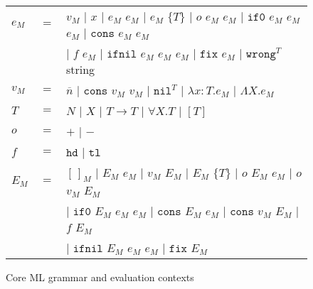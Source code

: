 \begin{figure}[p]
\centering
\begin{tabular}{lcl}
$e_{M}$ & $=$ & $v_{M}$ $\vert$ $x$ $\vert$ $e_{M}$ $e_{M}$ $\vert$ $e_{M}$ $\lbrace T\rbrace$ $\vert$ $o$ $e_{M}$ $e_{M}$ $\vert$ $\mathtt{if0}$ $e_{M}$ $e_{M}$ $e_{M}$ $\vert$ $\mathtt{cons}$ $e_{M}$ $e_{M}$ \\

\vspace{5pt}

&& $\vert$ $f$ $e_{M}$ $\vert$ $\mathtt{ifnil}$ $e_{M}$ $e_{M}$ $e_{M}$ $\vert$ $\mathtt{fix}$ $e_{M}$ $\vert$ $\mathtt{wrong}^{T}$ string \\

\vspace{5pt}

$v_{M}$ & $=$ & $\overline{n}$ $\vert$ $\mathtt{cons}$ $v_{M}$ $v_{M}$ $\vert$ $\mathtt{nil}^{T}$ $\vert$ $\lambda x:T.e_{M}$ $\vert$ $\Lambda X.e_{M}$ \\

\vspace{5pt}

$T$ & $=$ & $N$ $\vert$ $X$ $\vert$ $T\rightarrow T$ $\vert$ $\forall X.T$ $\vert$ $[T]$ \\

\vspace{5pt}

$o$ & $=$ & $\mathtt{+}$ $\vert$ $\mathtt{-}$ \\

\vspace{5pt}

$f$ & $=$ & $\mathtt{hd}$ $\vert$ $\mathtt{tl}$ \\

\vspace{5pt}

$E_{M}$ & $=$ & $[\,]_{M}$ $\vert$ $E_{M}$ $e_{M}$ $\vert$ $v_{M}$ $E_{M}$ $\vert$ $E_{M}$ $\lbrace T\rbrace$ $\vert$ $o$ $E_{M}$ $e_{M}$ $\vert$ $o$ $v_{M}$ $E_{M}$ \\

\vspace{5pt}

&& $\vert$ $\mathtt{if0}$ $E_{M}$ $e_{M}$ $e_{M}$ $\vert$ $\mathtt{cons}$ $E_{M}$ $e_{M}$ $\vert$ $\mathtt{cons}$ $v_{M}$ $E_{M}$ $\vert$ $f$ $E_{M}$ \\

\vspace{5pt}

&& $\vert$ $\mathtt{ifnil}$ $E_{M}$ $e_{M}$ $e_{M}$ $\vert$ $\mathtt{fix}$ $E_{M}$
\end{tabular}
\caption{Core ML grammar and evaluation contexts}
\label{cmg}
\end{figure}